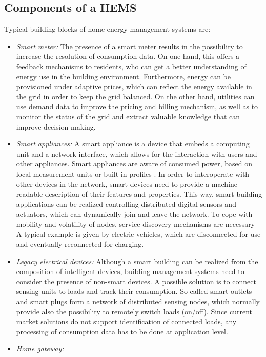 \documentclass{article}
\begin{document}
\subsection{Components of a \ac{HEMS}}
Typical building blocks of home energy management systems are:
\begin{itemize}
  \item \textit{Smart meter:}
  The presence of a smart meter results in the possibility to increase the resolution of consumption data.
  On one hand, this offers a feedback mechanisms to residents, who can get a better understanding of energy use in the building environment.
  Furthermore, energy can be provisioned under adaptive prices, which can reflect the energy available in the grid in order to keep the grid balanced.
  On the other hand, utilities can use demand data to improve the pricing and billing mechanism, as well as to monitor the status of the grid and extract valuable knowledge that can improve decision making.
\item \textit{Smart appliances:}
  A smart appliance is a device that embeds a computing unit and a network interface, which allows for the interaction with users and other appliances.
  Smart appliances are aware of consumed power, based on local measurement units or built-in profiles \cite{elmenreich:wises12}.
  In order to interoperate with other devices in the network, smart devices need to provide a machine-readable description of their features and properties.
  This way, smart building applications can be realized controlling distributed digital sensors and actuators, which can dynamically join and leave the network.
 To cope with mobility and volatility of nodes, service discovery mechanisms are necessary
  A typical example is given by electric vehicles, which are disconnected for use and eventually reconnected for charging.
\item \textit{Legacy electrical devices:}
  Although a smart building can be realized from the composition of intelligent devices, building management systems need to consider the presence of non-smart devices.
  A possible solution is to connect sensing units to loads and track their consumption.
  So-called smart outlets and smart plugs form a network of distributed sensing nodes, which normally provide also the possibility to remotely switch loads (on/off).
  Since current market solutions do not support identification of connected loads, any processing of consumption data has to be done at application level.
\item \textit{Home gateway:}

\end{itemize}
\end{document}
